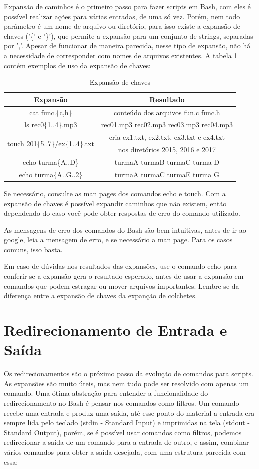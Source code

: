 	
	Expansão de caminhos é o primeiro passo para fazer scripts em Bash, com eles é possível realizar ações para várias entradas, de uma só vez. Porém, nem todo parâmetro é um nome de arquivo ou diretório, para isso existe a expansão de chaves ('\{' e '\}'), que permite a expansão para um conjunto de strings, separadas por ','. Apesar de funcionar de maneira parecida, nesse tipo de expansão, não há a necessidade de corresponder com nomes de arquivos existentes. A tabela \ref{table:3} contém exemplos de uso da expansão de chaves:
	
	\begin{table}[!ht]
		\centering
		\begin{tabular}{ | c | c | } 
			\hline
			\bfseries Expansão & \bfseries Resultado \\
			\hline
			cat func.\{c,h\} & conteúdo dos arquivos fun.c func.h \\
			\hline
			ls rec0\{1..4\}.mp3 & rec01.mp3 rec02.mp3 rec03.mp3 rec04.mp3 \\
			\hline
			\multirow{2}{13em}{touch 201\{5..7\}/ex\{1..4\}.txt} & cria ex1.txt, ex2.txt, ex3.txt e ex4.txt \\ 
			& nos diretórios 2015, 2016 e 2017 \\
			\hline
			echo turma\{A..D\} & turmaA turmaB turmaC turma D\\
			\hline
			echo turma\{A..G..2\} & turmaA turmaC turmaE turma G\\
			\hline
		\end{tabular}
		\caption{Expansão de chaves}
		\label{table:3}
	\end{table}
	Se necessário, consulte as man pages dos comandos echo e touch. Com a expansão de chaves é possível expandir caminhos que não existem, então dependendo do caso você pode obter respostas de erro do comando utilizado.
	
	As mensagens de erro dos comandos do Bash são bem intuitivas, antes de ir ao google, leia a mensagem de erro, e se necessário a man page. Para os casos comuns, isso basta.
	
	Em caso de dúvidas nos resultados das expansões, use o comando echo para conferir se a expansão gera o resultado esperado, antes de usar a expansão em comandos que podem estragar ou mover arquivos importantes. Lembre-se da diferença entre a expansão de chaves da expanção de colchetes.
	\section{Redirecionamento de Entrada e Saída}
	Os redirecionamentos são o próximo passo da evolução de comandos para scripts. As expansões são muito úteis, mas nem tudo pode ser resolvido com apenas um comando. Uma ótima abstração para entender a funcionalidade do redirecionamento no Bash é pensar nos comandos como filtros. Um comando recebe uma entrada e produz uma saída, até esse ponto do material a entrada era sempre lida pelo teclado (stdin - Standard Input) e imprimidas na tela (stdout - Standard Output), porém, se é possível usar comandos como filtros, podemos redirecionar a saída de um comando para a entrada de outro, e assim, combinar vários comandos para obter a saída desejada, com uma estrutura parecida com essa:
	
